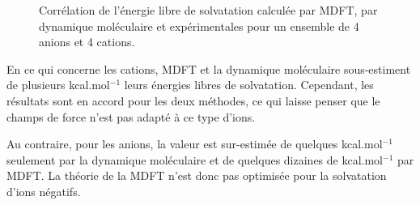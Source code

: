 \begin{figure}[H]
\begin{subfigure}[b]{0.49\textwidth}
{         }
    \end{subfigure}
   \begin{subfigure}[b]{0.5\textwidth}
       \centering
    \end{subfigure}
  \caption{Corrélation de l'énergie libre de solvatation calculée par MDFT, par dynamique moléculaire et expérimentales pour un ensemble de 4 anions et 4 cations.}
  \label{fig:correlation_ions}
\end{figure}




En ce qui concerne les cations, MDFT et la dynamique moléculaire sous-estiment de plusieurs kcal.mol$^{-1}$ leurs énergies libres de solvatation. Cependant, les résultats sont en accord pour les deux méthodes, ce qui laisse penser que le champs de force n'est pas adapté à ce type d'ions.

Au contraire, pour les anions, la valeur est sur-estimée de quelques kcal.mol$^{-1}$ seulement par la dynamique moléculaire et de quelques dizaines de kcal.mol$^{-1}$ par MDFT. La théorie de la MDFT n'est donc pas optimisée pour la solvatation d'ions négatifs. 

